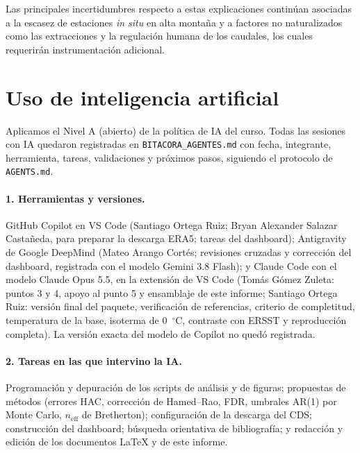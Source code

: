 \documentclass[11pt,a4paper]{article}
\newcommand{\archivo}[1]{\nolinkurl{#1}}
\begin{document}
Las principales incertidumbres respecto a estas explicaciones continúan asociadas a la escasez de estaciones \textit{in situ} en alta montaña y a factores no naturalizados como las extracciones y la regulación humana de los caudales, los cuales requerirán instrumentación adicional.



\section{Uso de inteligencia artificial}
\label{sec:ia}

Aplicamos el Nivel A (abierto) de la política de IA del curso. Todas las sesiones con IA quedaron registradas en \archivo{BITACORA_AGENTES.md} con fecha, integrante, herramienta, tareas, validaciones y próximos pasos, siguiendo el protocolo de \archivo{AGENTS.md}.

\paragraph{1. Herramientas y versiones.} GitHub Copilot en VS Code (Santiago Ortega Ruiz; Bryan Alexander Salazar Castañeda, para preparar la descarga ERA5; tareas del dashboard); Antigravity de Google DeepMind (Mateo Arango Cortés; revisiones cruzadas y corrección del dashboard, registrada con el modelo Gemini 3.8 Flash); y Claude Code con el modelo Claude Opus 5.5, en la extensión de VS Code (Tomás Gómez Zuleta: puntos 3 y 4, apoyo al punto 5 y ensamblaje de este informe; Santiago Ortega Ruiz: versión final del paquete, verificación de referencias, criterio de completitud, temperatura de la base, isoterma de 0~$^\circ$C, contraste con ERSST y reproducción completa). La versión exacta del modelo de Copilot no quedó registrada.

\paragraph{2. Tareas en las que intervino la IA.} Programación y depuración de los scripts de análisis y de figuras; propuestas de métodos (errores HAC, corrección de Hamed--Rao, FDR, umbrales AR(1) por Monte Carlo, $n_{\mathrm{eff}}$ de Bretherton); configuración de la descarga del CDS; construcción del dashboard; búsqueda orientativa de bibliografía; y redacción y edición de los documentos \LaTeX{} y de este informe.
\end{document}
